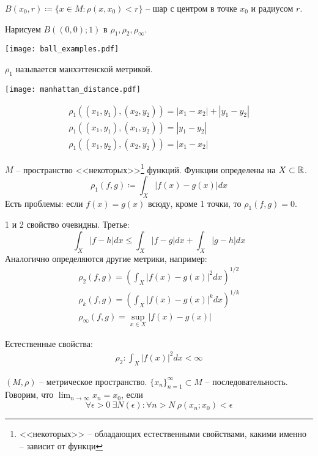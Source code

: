 \documentclass[main]{subfiles}
\begin{document}
\begin{definition}
    $B(x_0, r)\coloneqq\{x\in M : \rho(x,x_0) < r\}$ -- шар с центром в точке $x_0$ и радиусом $r$.
\end{definition}

Нарисуем $B((0,0);1)$ в $\rho_1, \rho_2, \rho_\infty.$

\begin{center}
    \texttt{[image: ball\_examples.pdf]}
\end{center}

\begin{minipage}{0.45\textwidth}
    $\rho_1$ называется манхэттенской метрикой.
\end{minipage}
\begin{minipage}{0.45\textwidth}
    \texttt{[image: manhattan\_distance.pdf]}
\end{minipage}
\begin{gather*}
    \rho_1((x_1, y_1), (x_2, y_2)) = |x_1 - x_2| + |y_1 - y_2|\\
    \rho_1((x_1, y_1), (x_1, y_2)) = |y_1 - y_2|\\
    \rho_1((x_1, y_2), (x_2, y_2)) = |x_1 - x_2|
\end{gather*}

\begin{example}
    $M$ --  пространство <<некоторых>>\footnote{<<некоторых>> -- обладающих естественными свойствами, какими именно -- зависит от функци}
    функций. Функции определены на $X\subset \mathbb{R}$.
    \[\rho_1(f,g) \coloneqq \int_X |f(x)-g(x)| dx\]
    Есть проблемы: если $f(x)=g(x)$ всюду, кроме 1 точки, то $\rho_1(f,g)=0$.

    1 и 2 свойство очевидны. Третье:
    \[\int_X |f-h| dx \le \int_X|f-g|dx + \int_X |g-h|dx\]
    Аналогично определяются другие метрики, например:
    \begin{gather*}
        \rho_2(f,g) = \left(\int_X |f(x)-g(x)|^2 dx\right)^{1/2}\\
        \rho_k(f,g) = \left(\int_X |f(x)-g(x)|^k dx\right)^{1/k}\\
        \rho_\infty(f,g) = \sup_{x\in X} |f(x)-g(x)|
    \end{gather*}

    Естественные свойства:
    \begin{gather*}
        \rho_2: \int_X |f(x)|^2 dx < \infty
    \end{gather*}
\end{example}

\begin{definition}
    $(M, \rho)$ -- метрическое пространство. $\{x_n\}^\infty_{n=1} \subset M$ -- последовательность.
    Говорим, что $\lim_{n\to\infty} x_n = x_0$, если
    \[\forall \epsilon>0 \ \exists N(\epsilon): \forall n > N \ \rho(x_n; x_0) < \epsilon\]
\end{definition}
\end{document}
